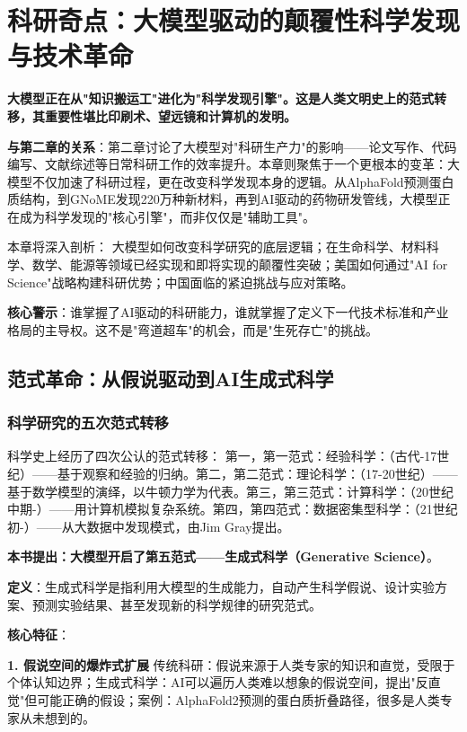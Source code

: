 \chapter{科研奇点：大模型驱动的颠覆性科学发现与技术革命}

\textbf{大模型正在从"知识搬运工"进化为"科学发现引擎"。这是人类文明史上的范式转移，其重要性堪比印刷术、望远镜和计算机的发明。}

\textbf{与第二章的关系}：第二章讨论了大模型对"科研生产力"的影响——论文写作、代码编写、文献综述等日常科研工作的效率提升。本章则聚焦于一个更根本的变革：大模型不仅加速了科研过程，更在改变科学发现本身的逻辑。从AlphaFold预测蛋白质结构，到GNoME发现220万种新材料，再到AI驱动的药物研发管线，大模型正在成为科学发现的"核心引擎"，而非仅仅是"辅助工具"。

本章将深入剖析：
大模型如何改变科学研究的底层逻辑；在生命科学、材料科学、数学、能源等领域已经实现和即将实现的颠覆性突破；美国如何通过"AI for Science"战略构建科研优势；中国面临的紧迫挑战与应对策略。

\textbf{核心警示}：谁掌握了AI驱动的科研能力，谁就掌握了定义下一代技术标准和产业格局的主导权。这不是"弯道超车"的机会，而是"生死存亡"的挑战。

\section{范式革命：从假说驱动到AI生成式科学}

\subsection{科学研究的五次范式转移}

科学史上经历了四次公认的范式转移：
第一，第一范式：经验科学：（古代-17世纪）——基于观察和经验的归纳。第二，第二范式：理论科学：（17-20世纪）——基于数学模型的演绎，以牛顿力学为代表。第三，第三范式：计算科学：（20世纪中期-）——用计算机模拟复杂系统。第四，第四范式：数据密集型科学：（21世纪初-）——从大数据中发现模式，由Jim Gray提出。

\textbf{本书提出：大模型开启了第五范式——生成式科学（Generative Science）}。

\textbf{定义}：生成式科学是指利用大模型的生成能力，自动产生科学假说、设计实验方案、预测实验结果、甚至发现新的科学规律的研究范式。

\textbf{核心特征}：

\textbf{1. 假说空间的爆炸式扩展}
传统科研：假说来源于人类专家的知识和直觉，受限于个体认知边界；生成式科学：AI可以遍历人类难以想象的假说空间，提出"反直觉"但可能正确的假设；案例：AlphaFold2预测的蛋白质折叠路径，很多是人类专家从未想到的。

